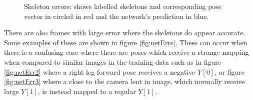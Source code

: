 \documentclass[11pt]{article} %
\begin{document}
\begin{figure}
\centering
{}
\qquad%
%
\caption{Skeleton errors: shows labelled skeletons and corresponding pose vector in circled in red and the network's prediction in blue. }
\label{fig:skelErrs}
\end{figure}


There are also frames with large error where the skeletons do appear accurate. Some examples of these are shown in figure \ref{fig:netErrs}. These can occur when there is a confusing case where there are poses which receive a strange mapping when compared to similar images in the training data such as in figure \ref{fig:netErr2} where a right leg forward pose receives a negative $Y[0]$, or figure \ref{fig:netErr3} where a close to the camera lent in image, which normally receive large $Y[1]$, is instead mapped to a regular $Y[1]$. 
\end{document}
